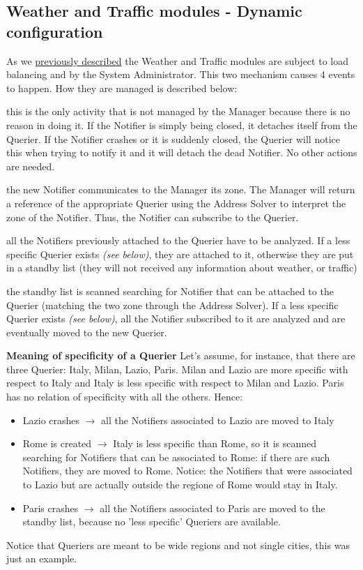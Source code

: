 \subsection{Weather and Traffic modules - Dynamic configuration}
	As we \hyperref[sect:WeatherTrafficModules]{previously described} the Weather and Traffic modules are subject to load balancing and  by the System Administrator. This two mechanism causes 4 events to happen. How they are managed is described below:
	\begin{description}[before={\renewcommand{\makelabel}[1]{-- \textit{##1}:}}]
		\item[a Notifier is deleted] this is the only activity that is not managed by the Manager because there is no reason in doing it. If the Notifier is simply being closed, it detaches itself from the Querier. If the Notifier crashes or it is suddenly closed, the Querier will notice this when trying to notify it and it will detach the dead Notifier. No other actions are needed.
		\item[a Notifier is created] the new Notifier communicates to the Manager its zone. The Manager will return a reference of the appropriate Querier using the Address Solver to interpret the zone of the Notifier. Thus, the Notifier can subscribe to the Querier.
		\item[a new Quierier is deleted] all the Notifiers previously attached to the Querier have to be analyzed. If a less specific Querier exists \textit{(see below)}, they are attached to it, otherwise they are put in a standby list (they will not received any information about weather, or traffic)
		\item[a new Quierier is instantiated] the standby list is scanned searching for Notifier that can be attached to the Querier (matching the two zone through the Address Solver). If a less specific Querier exists \textit{(see below)}, all the Notifier subscribed to it are analyzed and are eventually moved to the new Querier.
	\end{description}
	\medskip
	\textbf{Meaning of specificity of a Querier}\newline
	Let's assume, for instance, that there are three Querier: Italy, Milan, Lazio, Paris. Milan and Lazio are more specific with respect to Italy and Italy is less specific with respect to Milan and Lazio. Paris has no relation of specificity with all the others.\newline
	Hence:
	\begin{itemize}[label=--]
		\item Lazio crashes $\rightarrow$ all the Notifiers associated to Lazio are moved to Italy
		\item Rome is created $\rightarrow$ Italy is less specific than Rome, so it is scanned searching for Notifiers that can be associated to Rome: if there are such Notifiers, they are moved to Rome. Notice: the Notifiers that were associated to Lazio but are actually outside the regione of Rome would stay in Italy.
		\item Paris crashes $\rightarrow$ all the Notifiers associated to Paris are moved to the standby list, because no 'less specific' Queriers are available.
	\end{itemize}
	\smallskip
	Notice that Queriers are meant to be wide regions and not single cities, this was just an example.
